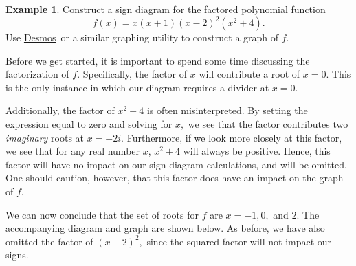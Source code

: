 \documentclass[12pt]{book}
\theoremstyle{definition}
\newtheorem{example}{Example}
\newcommand{\Desmos}{\href{https://www.desmos.com/}{Desmos}}
\begin{document}
\begin{example}\label{sign_diag_poly_3}
Construct a sign diagram for the factored polynomial function $$f(x)=x(x+1)(x-2)^2(x^2+4).$$
Use \Desmos \ or a similar graphing utility to construct a graph of $f$.
\par
Before we get started, it is important to spend some time discussing the factorization of $f$.  Specifically, the factor of $x$ will contribute a root of $x=0$.  This is the only instance in which our diagram requires a divider at $x=0.$
\par
Additionally, the factor of $x^2+4$ is often misinterpreted.  By setting the expression equal to zero and solving for $x,$ we see that the factor contributes two {\it imaginary} roots at $x=\pm 2i$.  Furthermore, if we look more closely at this factor, we see that for any real number $x$, $x^2+4$ will always be positive.  Hence, this factor will have no impact on our sign diagram calculations, and will be omitted.  One should caution, however, that this factor does have an impact on the graph of $f$.
\par
We can now conclude that the set of roots for $f$ are $x=-1, 0,$ and $2$.  The accompanying diagram and graph are shown below.  As before, we have also omitted the factor of $(x-2)^2,$ since the squared factor will not impact our signs.
\begin{center}
\end{center}
\begin{center}
\end{center}
\end{example}
\end{document}
